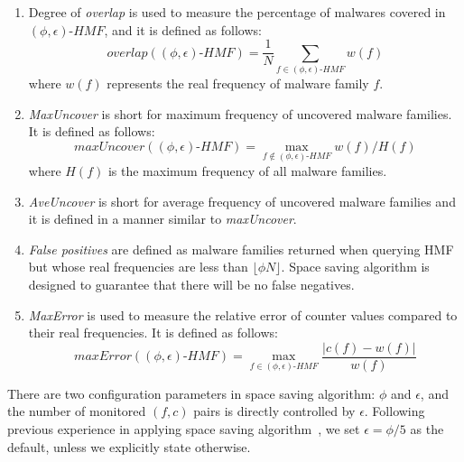 \begin{enumerate}

\item 
Degree of \textit{overlap} is used to measure the percentage of malwares covered in $(\phi, \epsilon)\mbox{-}HMF$,
and it is defined as follows:
\vspace{-0.05in}
\begingroup\makeatletter\def\f@size{8}\check@mathfonts
$$overlap((\phi, \epsilon)\mbox{-}HMF) = \dfrac{1}{N}\sum_{f \in (\phi, \epsilon)\mbox{-}HMF}w(f)$$
\endgroup
where $w(f)$ represents the real frequency of malware family $f$.  

\item 
\textit{MaxUncover} is short for maximum frequency of uncovered malware families. 
It is defined as follows:
\vspace{-0.05in}
\begingroup\makeatletter\def\f@size{8}\check@mathfonts
$$maxUncover((\phi, \epsilon)\mbox{-}HMF) = \max_{f \notin (\phi, \epsilon)\mbox{-}HMF}w(f)/H(f)$$
\endgroup
where $H(f)$ is the maximum frequency of all malware families. 

\item 
\textit{AveUncover} is short for average frequency of uncovered malware families 
and it is defined in a manner similar to \textit{maxUncover}. 

\item 
\textit{False positives} are defined as malware families returned when querying HMF
but whose real frequencies are less than $\lfloor \phi N \rfloor$. 
Space saving algorithm is designed to guarantee that there will be no false negatives. 

\item 
\textit{MaxError} is used to measure the relative error of counter values
compared to their real frequencies.
It is defined as follows:
\vspace{-0.05in}
\begingroup\makeatletter\def\f@size{8}\check@mathfonts
$$maxError((\phi, \epsilon)\mbox{-}HMF) = \max_{f \in (\phi, \epsilon)\mbox{-}HMF} \dfrac{\left|c(f) - w(f)\right|}{w(f)}$$
\endgroup


\end{enumerate}

There are two configuration parameters in space saving algorithm: $\phi$ and $\epsilon$, 
and the number of monitored $(f, c)$ pairs is directly controlled by $\epsilon$. 
Following previous experience in applying space saving algorithm~\cite{hot-calling-context}, 
we set $\epsilon = \phi/5$ as the default, 
unless we explicitly state otherwise.  

